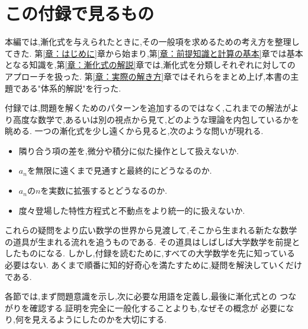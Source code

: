 \section{この付録で見るもの}

本編では,漸化式を与えられたときに,その一般項を求めるための考え方を整理してきた.
第\ref{章：はじめに}章から始まり,第\ref{章：前提知識と計算の基本}章では基本となる知識を,第\ref{章：漸化式の解説}章では,漸化式を分類しそれぞれに対してのアプローチを扱った.
第\ref{章：実際の解き方}章ではそれらをまとめ上げ,本書の主題である"体系的解説"を行った.

付録では,問題を解くためのパターンを追加するのではなく,これまでの解法がより高度な数学で,あるいは別の視点から見て,どのような理論を内包しているかを眺める.
一つの漸化式を少し遠くから見ると,次のような問いが現れる.

\begin{itemize}
  \item 隣り合う項の差を,微分や積分に似た操作として扱えないか.
  \item $a_n$を無限に遠くまで見通すと最終的にどうなるのか.
  \item $a_n$の$n$を実数に拡張するとどうなるのか.
  \item 度々登場した特性方程式と不動点をより統一的に扱えないか.
\end{itemize}

これらの疑問をより広い数学の世界から見渡して,そこから生まれる新たな数学の道具が生まれる流れを追うものである.
その道具はしばしば大学数学を前提としたものになる.
しかし,付録を読むために,すべての大学数学を先に知っている必要はない.
あくまで順番に知的好奇心を満たすために,疑問を解決していくだけである.

各節では,まず問題意識を示し,次に必要な用語を定義し,最後に漸化式との
つながりを確認する.証明を完全に一般化することよりも,なぜその概念が
必要になり,何を見えるようにしたのかを大切にする.